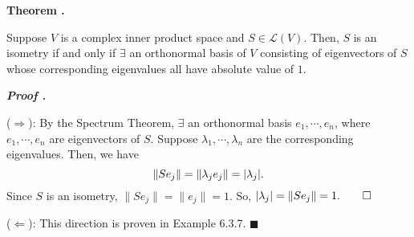 \documentclass[11pt, letterpaper]{article}
\newcounter{index}[subsection]
\newenvironment*{thm}[1]{\begin{tcolorbox}\par\noindent\textbf{Theorem \thesubsection.\stepcounter{index}\theindex\ #1} \par}{\par\end{tcolorbox}}
\newcounter{nprf}[subsection]
\newenvironment*{prf}{\par\indent\textbf{\textit{Proof \stepcounter{nprf}\thenprf.}}}{\hfill$\blacksquare$\par}
\def\L{\mathcal{L}}
\def\pqde{\qquad\square}
\begin{document}
\begin{thm}{}
	Suppose $V$ is a complex inner product space and $S\in\L(V)$. Then, $S$ is an isometry if and only if $\exists$ an orthonormal basis of $V$ consisting of eigenvectors of $S$ whose corresponding eigenvalues all have absolute value of $1$.	
\end{thm}
\begin{prf}
	\par ($\Rightarrow$): By the Spectrum Theorem, $\exists$ an orthonormal basis $e_1,\cdots,e_n$, where $e_1,\cdots,e_n$ are eigenvectors of $S$. Suppose $\lambda_1,\cdots,\lambda_n$ are the corresponding eigenvalues. Then, we have \[\|Se_j\|=\|\lambda_je_j\|=\qty|\lambda_j|.\] Since $S$ is an isometry, $\|Se_j\|=\|e_j\|=1$. So, $\qty|\lambda_j|=\|Se_j\|=1.\pqde$
	\par ($\Leftarrow$): This direction is proven in Example 6.3.7. 
\end{prf}

\newpage
\end{document}
